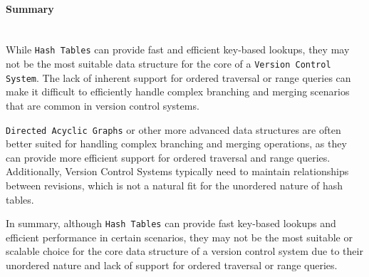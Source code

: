 \paragraph{Summary}
\hfill\medskip\\
While \lstinline{Hash Tables} can provide fast and efficient key-based lookups, they may not be the most suitable data structure for the core of a \lstinline{Version Control System}. The lack of inherent support for ordered traversal or range queries can make it difficult to efficiently handle complex branching and merging scenarios that are common in version control systems.
\smallskip

\lstinline{Directed Acyclic Graphs} or other more advanced data structures are often better suited for handling complex branching and merging operations, as they can provide more efficient support for ordered traversal and range queries. Additionally, Version Control Systems typically need to maintain relationships between revisions, which is not a natural fit for the unordered nature of hash tables.
\smallskip

In summary, although \lstinline{Hash Tables} can provide fast key-based lookups and efficient performance in certain scenarios, they may not be the most suitable or scalable choice for the core data structure of a version control system due to their unordered nature and lack of support for ordered traversal or range queries.

